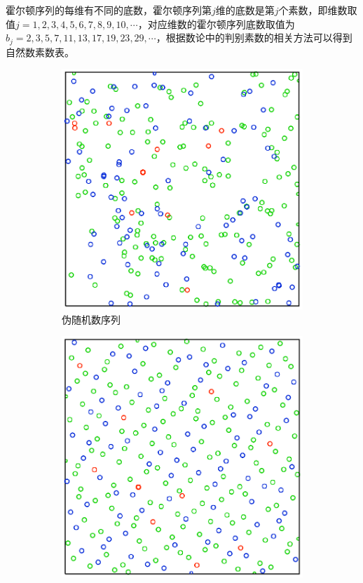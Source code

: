 霍尔顿序列的每维有不同的底数，霍尔顿序列第$j$维的底数是第$j$个素数，即维数取值$j=1,2,3,4,5,6,7,8,9,10,\cdots$，对应维数的霍尔顿序列底数取值为$b_j=2,3,5,7,11,13,17,19,23,29,\cdots$，根据数论中的判别素数的相关方法可以得到自然数素数表。

\begin{figure}
\sidecaption
	{\begin{subfigure}[b]{0.3\textwidth}
		\includegraphics[width=1.\textwidth]{figures/mc/halton-1}
		\caption{伪随机数序列}
	\end{subfigure}
	\begin{subfigure}[b]{0.3\textwidth}
		\includegraphics[width=1.\textwidth]{figures/mc/halton-2}

\end{subfigure}}
\end{figure}
